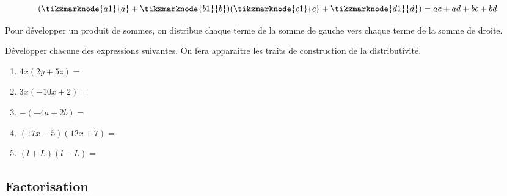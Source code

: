 \documentclass{article}
\begin{document}
\begin{equation*}
(\tikzmarknode{a1}{a} + \tikzmarknode{b1}{b})(\tikzmarknode{c1}{c} + \tikzmarknode{d1}{d}) =
ac + ad + bc + bd
\end{equation*}
\begin{tcolorbox}
Pour développer un produit de sommes, on \og distribue \fg chaque terme de la somme de gauche vers chaque terme de la somme de droite.
\end{tcolorbox}
\begin{example}
Développer chacune des expressions suivantes. On fera apparaître les traits de construction de la distributivité.
\begin{enumerate}[label=\alph*), parsep=0.5cm, topsep=0.5cm]
\item $4x(2y + 5z) = $ \answerline
\item $3x(-10x + 2) = $ \answerline
\item $-(-4a + 2b) = $ \answerline
\item $(17x - 5)(12x + 7) = $ \answerline
\item $(l + L)(l - L) = $ \answerline
\end{enumerate}
\end{example}

\newpage
\subsection{Factorisation}
\end{document}
